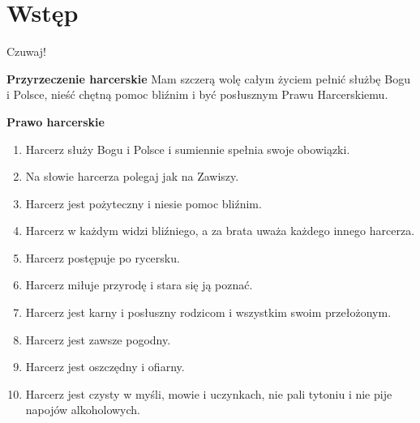 \chapter{Wstęp}

Czuwaj!



\textbf{Przyrzeczenie harcerskie}
Mam szczerą wolę całym życiem pełnić służbę Bogu i Polsce, nieść chętną pomoc bliźnim i być posłusznym Prawu Harcerskiemu.


\textbf{Prawo harcerskie}%
\begin{enumerate}
\itemsep0em 
\item Harcerz służy Bogu i Polsce i sumiennie spełnia swoje obowiązki.
\item Na słowie harcerza polegaj jak na Zawiszy.
\item Harcerz jest pożyteczny i niesie pomoc bliźnim.
\item Harcerz w każdym widzi bliźniego, a za brata uważa każdego innego harcerza.
\item Harcerz postępuje po rycersku.
\item Harcerz miłuje przyrodę i stara się ją poznać.
\item Harcerz jest karny i posłuszny rodzicom i wszystkim swoim przełożonym.
\item Harcerz jest zawsze pogodny.
\item Harcerz jest oszczędny i ofiarny.
\item Harcerz jest czysty w myśli, mowie i uczynkach, nie pali tytoniu i nie pije napojów alkoholowych.
\end{enumerate}

